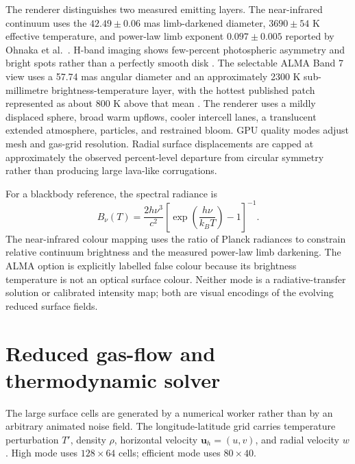 \documentclass[11pt,a4paper]{article}
\begin{document}
The renderer distinguishes two measured emitting layers. The near-infrared continuum uses the $42.49\pm0.06$ mas limb-darkened diameter, $3690\pm54$ K effective temperature, and power-law limb exponent $0.097\pm0.005$ reported by Ohnaka et al.\ \cite{ohnaka2011}. H-band imaging shows few-percent photospheric asymmetry and bright spots rather than a perfectly smooth disk \cite{haubois2009}. The selectable ALMA Band 7 view uses a 57.74 mas angular diameter and an approximately 2300 K sub-millimetre brightness-temperature layer, with the hottest published patch represented as about 800 K above that mean \cite{dent2026}. The renderer uses a mildly displaced sphere, broad warm upflows, cooler intercell lanes, a translucent extended atmosphere, particles, and restrained bloom. GPU quality modes adjust mesh and gas-grid resolution. Radial surface displacements are capped at approximately the observed percent-level departure from circular symmetry rather than producing large lava-like corrugations.

For a blackbody reference, the spectral radiance is
\begin{equation}
B_\nu(T)=\frac{2h\nu^3}{c^2}\left[\exp\left(\frac{h\nu}{k_BT}\right)-1\right]^{-1}.
\end{equation}
The near-infrared colour mapping uses the ratio of Planck radiances to constrain relative continuum brightness and the measured power-law limb darkening. The ALMA option is explicitly labelled false colour because its brightness temperature is not an optical surface colour. Neither mode is a radiative-transfer solution or calibrated intensity map; both are visual encodings of the evolving reduced surface fields.

\section{Reduced gas-flow and thermodynamic solver}

The large surface cells are generated by a numerical worker rather than by an arbitrary animated noise field. The longitude-latitude grid carries temperature perturbation $T'$, density $\rho$, horizontal velocity $\bm{u}_h=(u,v)$, and radial velocity $w$. High mode uses $128\times64$ cells; efficient mode uses $80\times40$.
\end{document}
